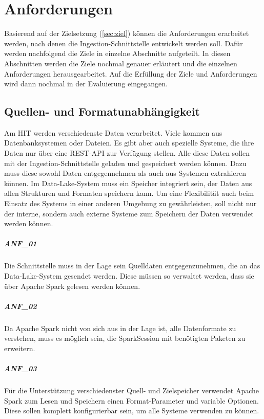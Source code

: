 \chapter{Anforderungen}
\label{sec:anf}

Basierend auf der Zielsetzung (\cref{sec:ziel}) können die Anforderungen erarbeitet werden, nach denen die Ingestion-Schnittstelle entwickelt werden soll.
Dafür werden nachfolgend die Ziele in einzelne Abschnitte aufgeteilt.
In diesen Abschnitten werden die Ziele nochmal genauer erläutert und die einzelnen Anforderungen herausgearbeitet.
Auf die Erfüllung der Ziele und Anforderungen wird dann nochmal in der Evaluierung eingegangen.

\section{Quellen- und Formatunabhängigkeit}
\label{sec:anf-unab}
Am HIT werden verschiedenste Daten verarbeitet.
Viele kommen aus Datenbanksystemen oder Dateien.
Es gibt aber auch spezielle Systeme, die ihre Daten nur über eine REST-API zur Verfügung stellen.
Alle diese Daten sollen mit der Ingestion-Schnittstelle geladen und gespeichert werden können.
Dazu muss diese sowohl Daten entgegennehmen als auch aus Systemen extrahieren können.
Im Data-Lake-System muss ein Speicher integriert sein, der Daten aus allen Strukturen und Formaten speichern kann.
Um eine Flexibilität auch beim Einsatz des Systems in einer anderen Umgebung zu gewährleisten, soll nicht nur der interne, sondern auch externe Systeme zum Speichern der Daten verwendet werden können.
\pagebreak
\paragraph{ANF\_01}
\label{ANF_01}
Die Schnittstelle muss in der Lage sein Quelldaten entgegenzunehmen, die an das Data-Lake-System gesendet werden.
Diese müssen so verwaltet werden, dass sie über Apache Spark gelesen werden können.

\paragraph{ANF\_02}
\label{ANF_02}
Da Apache Spark nicht von sich aus in der Lage ist, alle Datenformate zu verstehen, muss es möglich sein, die SparkSession mit benötigten Paketen zu erweitern.

\paragraph{ANF\_03}
\label{ANF_03}
Für die Unterstützung verschiedenster Quell- und Zielspeicher verwendet Apache Spark zum Lesen und Speichern einen Format-Parameter und variable Optionen.
Diese sollen komplett konfigurierbar sein, um alle Systeme verwenden zu können.

